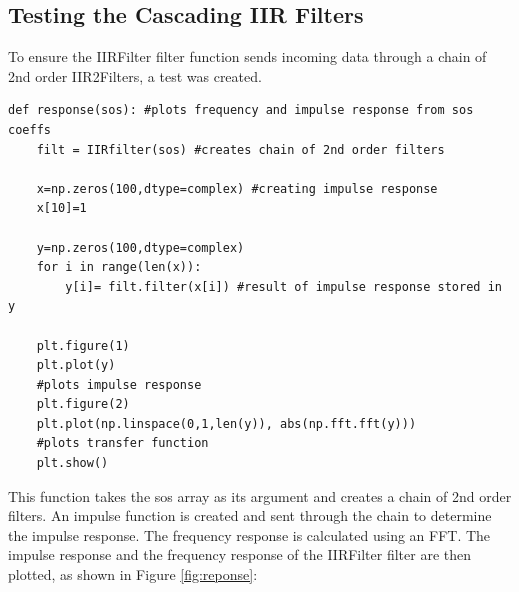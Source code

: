 \documentclass{article}
\begin{document}
\subsection{Testing the Cascading IIR Filters}
To ensure the IIRFilter filter function sends incoming data through a chain of 2nd order IIR2Filters, a test was created.
\begin{lstlisting}
def response(sos): #plots frequency and impulse response from sos coeffs
    filt = IIRfilter(sos) #creates chain of 2nd order filters

    x=np.zeros(100,dtype=complex) #creating impulse response
    x[10]=1

    y=np.zeros(100,dtype=complex)
    for i in range(len(x)):
        y[i]= filt.filter(x[i]) #result of impulse response stored in y
        
    plt.figure(1)
    plt.plot(y)
    #plots impulse response
    plt.figure(2)
    plt.plot(np.linspace(0,1,len(y)), abs(np.fft.fft(y)))
    #plots transfer function
    plt.show()
\end{lstlisting}
This function takes the sos array as its argument and creates a chain of 2nd order filters. An impulse function is created and sent through the chain to determine the impulse response. The frequency response is calculated using an FFT. The impulse response and the frequency response of the IIRFilter filter are then plotted, as shown in Figure \ref{fig:reponse}:
\end{document}
